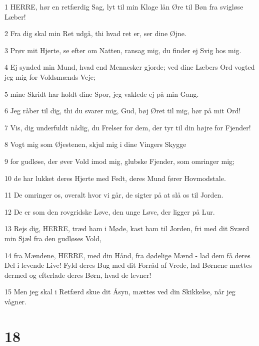 \par 1 HERRE, hør en retfærdig Sag, lyt til min Klage lån Øre til Bøn fra svigløse Læber!
\par 2 Fra dig skal min Ret udgå, thi hvad ret er, ser dine Øjne.
\par 3 Prøv mit Hjerte, se efter om Natten, ransag mig, du finder ej Svig hos mig.
\par 4 Ej synded min Mund, hvad end Mennesker gjorde; ved dine Læbers Ord vogted jeg mig for Voldsmænds Veje;
\par 5 mine Skridt har holdt dine Spor, jeg vaklede ej på min Gang.
\par 6 Jeg råber til dig, thi du svarer mig, Gud, bøj Øret til mig, hør på mit Ord!
\par 7 Vis, dig underfuldt nådig, du Frelser for dem, der tyr til din højre for Fjender!
\par 8 Vogt mig som Øjestenen, skjul mig i dine Vingers Skygge
\par 9 for gudløse, der øver Vold imod mig, glubske Fjender, som omringer mig;
\par 10 de har lukket deres Hjerte med Fedt, deres Mund fører Hovmodstale.
\par 11 De omringer os, overalt hvor vi går, de sigter på at slå os til Jorden.
\par 12 De er som den rovgridske Løve, den unge Løve, der ligger på Lur.
\par 13 Rejs dig, HERRE, træd ham i Møde, kast ham til Jorden, fri med dit Sværd min Sjæl fra den gudløses Vold,
\par 14 fra Mændene, HERRE, med din Hånd, fra dødelige Mænd - lad dem få deres Del i levende Live! Fyld deres Bug med dit Forråd af Vrede, lad Børnene mættes dermed og efterlade deres Børn, hvad de levner!
\par 15 Men jeg skal i Retfærd skue dit Åsyn, mættes ved din Skikkelse, når jeg vågner.

\chapter{18}

